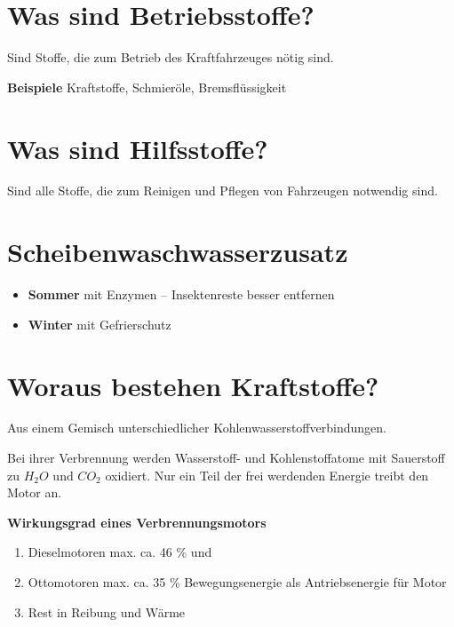 \section{Was sind Betriebsstoffe?}\label{was-sind-betriebsstoffe}

Sind Stoffe, die zum Betrieb des Kraftfahrzeuges nötig sind.

\textbf{Beispiele} Kraftstoffe, Schmieröle, Bremsflüssigkeit

\section{Was sind Hilfsstoffe?}\label{was-sind-hilfsstoffe}

Sind alle Stoffe, die zum Reinigen und Pflegen von Fahrzeugen notwendig
sind.

\section{Scheibenwaschwasserzusatz}\label{scheibenwaschwasserzusatz}

\begin{itemize}
\item
  \textbf{Sommer} mit Enzymen -- Insektenreste besser entfernen
\item
  \textbf{Winter} mit Gefrierschutz
\end{itemize}

\section{Woraus bestehen
Kraftstoffe?}\label{woraus-bestehen-kraftstoffe}

Aus einem Gemisch unterschiedlicher Kohlenwasserstoffverbindungen.

Bei ihrer Verbrennung werden Wasserstoff- und Kohlenstoffatome mit
Sauerstoff zu $H_2O \text{ und } CO_2$ oxidiert. Nur ein Teil der frei
werdenden Energie treibt den Motor an.

\textbf{Wirkungsgrad eines Verbrennungsmotors}

\begin{enumerate}
\item
  Dieselmotoren max. ca. 46 \% und
\item
  Ottomotoren max. ca. 35 \% Bewegungsenergie als Antriebsenergie für
  Motor
\item
  Rest in Reibung und Wärme
\end{enumerate}

